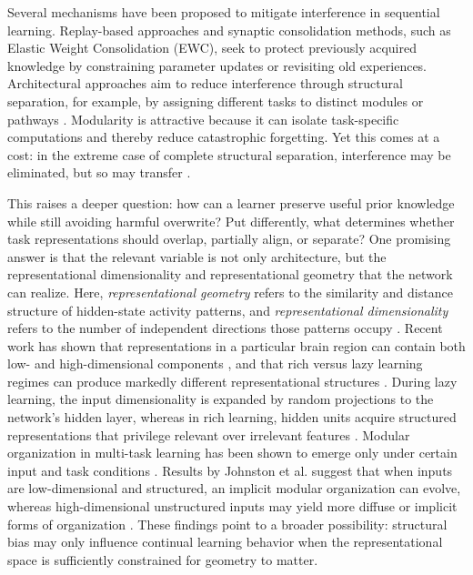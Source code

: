 \documentclass[letterpaper]{article}
\begin{document}
        Several mechanisms have been proposed to mitigate interference in sequential learning. Replay-based approaches and synaptic consolidation methods, such as Elastic Weight Consolidation (EWC), seek to protect previously acquired knowledge by constraining parameter updates or revisiting old experiences. \cite{kirkpatrick2017overcoming, rolnick2019experience} Architectural approaches aim to reduce interference through structural separation, for example, by assigning different tasks to distinct modules or pathways \cite{ellefsen2015neural}. Modularity is attractive because it can isolate task-specific computations and thereby reduce catastrophic forgetting. Yet this comes at a cost: in the extreme case of complete structural separation, interference may be eliminated, but so may transfer \cite{holton2025humans}. 
        
        This raises a deeper question: how can a learner preserve useful prior knowledge while still avoiding harmful overwrite? Put differently, what determines whether task representations should overlap, partially align, or separate? One promising answer is that the relevant variable is not only architecture, but the representational dimensionality and representational geometry that the network can realize. Here, \emph{representational geometry} refers to the similarity and distance structure of hidden-state activity patterns, and \emph{representational dimensionality} refers to the number of independent directions those patterns occupy \cite{kriegeskorte2013representational}. Recent work has shown that representations in a particular brain region can contain both low- and high-dimensional components \cite{johnston2024modular}, and that rich versus lazy learning regimes can produce markedly different representational structures \cite{yu2025dimensionality}.
        During lazy learning, the input dimensionality is expanded by random projections to the network's hidden layer, whereas in rich learning, hidden units acquire structured representations that privilege relevant over irrelevant features \cite{flesch2021rich}.
        Modular organization in multi-task learning has been shown to emerge only under certain input and task conditions \cite{Johnston2024.09.30.615925, yue2017brain}. Results by Johnston et al. suggest that when inputs are low-dimensional and structured, an implicit modular organization can evolve, whereas high-dimensional unstructured inputs may yield more diffuse or implicit forms of organization \cite{Johnston2024.09.30.615925}. These findings point to a broader possibility: structural bias may only influence continual learning behavior when the representational space is sufficiently constrained for geometry to matter.
        
\end{document}
